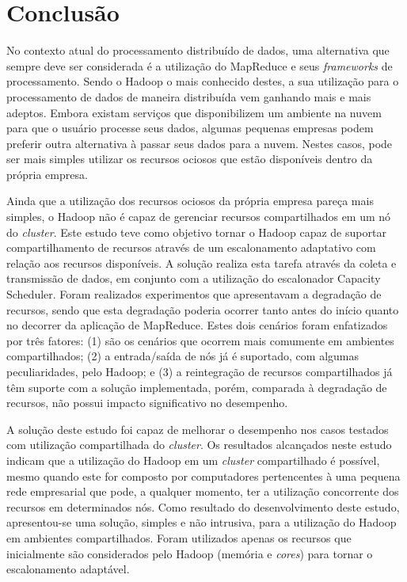 \chapter{Conclusão}

No contexto atual do processamento distribuído de dados, uma alternativa que sempre deve ser considerada é a utilização do MapReduce e seus \textit{frameworks} de processamento. Sendo o Hadoop o mais conhecido destes, a sua utilização para o processamento de dados de maneira distribuída vem ganhando mais e mais adeptos. Embora existam serviços que disponibilizem um ambiente na nuvem para que o usuário processe seus dados, algumas pequenas empresas podem preferir outra alternativa à passar seus dados para a nuvem. Nestes casos, pode ser mais simples utilizar os recursos ociosos que estão disponíveis dentro da própria empresa.

Ainda que a utilização dos recursos ociosos da própria empresa pareça mais simples, o Hadoop não é capaz de gerenciar recursos compartilhados em um nó do \textit{cluster}. Este estudo teve como objetivo tornar o Hadoop capaz de suportar compartilhamento de recursos através de um escalonamento adaptativo com relação aos recursos disponíveis. A solução realiza esta tarefa através da coleta e transmissão de dados, em conjunto com a utilização do escalonador Capacity Scheduler. Foram realizados experimentos que apresentavam a degradação de recursos, sendo que esta degradação poderia ocorrer tanto antes do início quanto no decorrer da aplicação de MapReduce. Estes dois cenários foram enfatizados por três fatores: (1) são os cenários que ocorrem mais comumente em ambientes compartilhados; (2) a entrada/saída de nós já é suportado, com algumas peculiaridades, pelo Hadoop; e (3) a reintegração de recursos compartilhados já têm suporte com a solução implementada, porém, comparada à degradação de recursos, não possui impacto significativo no desempenho.

A solução deste estudo foi capaz de melhorar o desempenho nos casos testados com utilização compartilhada do \textit{cluster}. Os resultados alcançados neste estudo indicam que a utilização do Hadoop em um \textit{cluster} compartilhado é possível, mesmo quando este for composto por computadores pertencentes à uma pequena rede empresarial que pode, a qualquer momento, ter a utilização concorrente dos recursos em determinados nós. Como resultado do desenvolvimento deste estudo, apresentou-se uma solução, simples e não intrusiva, para a utilização do Hadoop em ambientes compartilhados. Foram utilizados apenas os recursos que inicialmente são considerados pelo Hadoop (memória e \textit{cores})  para tornar o escalonamento adaptável.

